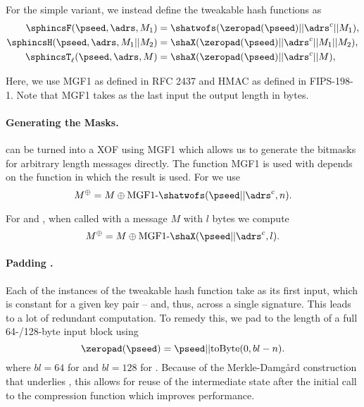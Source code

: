    For the simple variant, we instead define the tweakable hash functions as
   \begin{equation}
   \begin{aligned}
      \sphincsF(\pseed, \adrs, M_1) &= \shatwofs(\zeropad(\pseed) || \adrs^{c} || M_1),\\
      \sphincsH(\pseed, \adrs, M_1 || M_2) &= \shaX(\zeropad(\pseed) || \adrs^{c} || M_1 || M_2),\\
      \sphincsT_\ell(\pseed, \adrs, M) &= \shaX(\zeropad(\pseed) || \adrs^{c} || M),\\
   \end{aligned}
   \end{equation}

   Here, we use MGF1 as defined in RFC 2437 and HMAC as defined in FIPS-198-1.
   Note that MGF1 takes as the last input the output length in bytes.
   \paragraph{Generating the Masks.} \shatwo can be turned into a XOF using MGF1
   which allows us to generate the bitmasks for arbitrary length messages directly. The function MGF1 is used with depends on the function in which the result is used. For \sphincsF we use
   \begin{equation*}
      M^{\oplus} = M \oplus \text{MGF1-}\shatwofs(\pseed || \adrs^{c}, n).
   \end{equation*}

   For \sphincsH and \sphincsT, when called with a message $M$ with $l$ bytes we compute
   \begin{equation*}
      M^{\oplus} = M \oplus \text{MGF1-}\shaX(\pseed || \adrs^{c}, l).
   \end{equation*}

   \paragraph{Padding \pseed.} Each of the instances of the tweakable hash function take \pseed as its first input, which is constant for a given key pair -- and, thus, across a single signature.
   This leads to a lot of redundant computation. To remedy this, we pad \pseed to the length of a full 64-/128-byte \shatwo input block using
  \begin{equation*}
      \zeropad(\pseed) = \pseed || \text{toByte}(0, bl - n).
   \end{equation*}
   where $bl= 64$ for \shatwofs and $bl = 128$ for \shatwofivetwelve.
   Because of the Merkle-Damg\aa{}rd construction that underlies \shatwo, this allows for reuse of the intermediate \shatwo state after the initial call to the compression function
   which improves performance.

